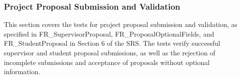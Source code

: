 \documentclass[12pt, titlepage]{article}
\begin{document}
\subsubsection{Project Proposal Submission and Validation}


This section covers the tests for project proposal submission and validation, as specified in FR\_SupervisorProposal, FR\_ProposalOptionalFields, and FR\_StudentProposal in Section 6 of the SRS. The tests verify successful supervisor and student proposal submissions, as well as the rejection of incomplete submissions and acceptance of proposals without optional information.
\end{document}
